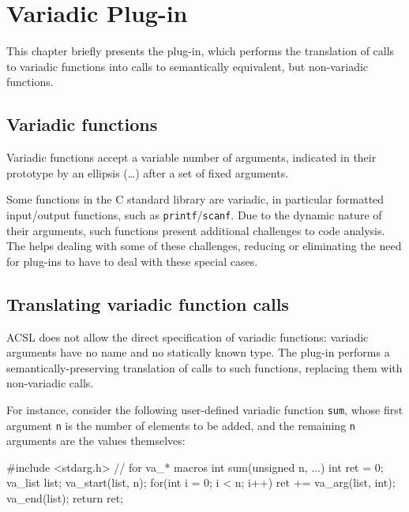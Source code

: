 
\chapter{Variadic Plug-in}
\label{user-variadic}

This chapter briefly presents the  plug-in, which
performs the translation of calls to variadic functions into calls to
semantically equivalent, but non-variadic functions.

\section*{Variadic functions}

Variadic functions accept a variable number of arguments, indicated in
their prototype by an ellipsis (\ldots) after a set of fixed arguments.

Some functions in the C standard library are variadic, in particular
formatted input/output functions, such as \texttt{printf}/\texttt{scanf}.
Due to the dynamic nature of their arguments, such functions present additional
challenges to code analysis. The  helps dealing with some
of these challenges, reducing or eliminating the need for plug-ins to have
to deal with these special cases.

\section{Translating variadic function calls}

ACSL does not allow the direct specification of variadic functions: variadic
arguments have no name and no statically known type. The 
plug-in performs a semantically-preserving translation of calls to such
functions, replacing them with non-variadic calls.

For instance, consider the following user-defined variadic function \verb+sum+,
whose first argument \verb+n+ is the number of elements to be added, and the
remaining \verb+n+ arguments are the values themselves:

\begin{ccode}
#include <stdarg.h> // for va_* macros
int sum(unsigned n, ...) {
  int ret = 0;
  va_list list;
  va_start(list, n);
  for(int i = 0; i < n; i++){
    ret += va_arg(list, int);
  }
  va_end(list);
  return ret;
}
\end{ccode}

